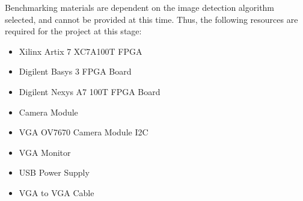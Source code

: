 Benchmarking materials are dependent on the image detection algorithm selected, and cannot be provided at this time. Thus, the following resources are required for the project at this stage:

\begin{itemize}
    \item Xilinx Artix 7 XC7A100T FPGA
    \item Digilent Basys 3 FPGA Board
    \item Digilent Nexys A7 100T FPGA Board
    \item Camera Module
    \item VGA OV7670 Camera Module I2C
    \item VGA Monitor
    \item USB Power Supply
    \item VGA to VGA Cable
\end{itemize}
